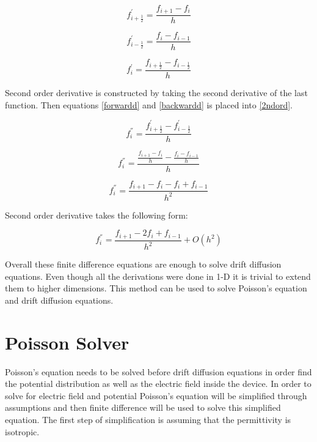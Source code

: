 \begin{doublespace}
\begin{equation}
f_{i+\frac{1}{2}}^{'}=\frac{f_{i+1}-f_{i}}{h}
\label{forwardd}
\end{equation}

\begin{equation}
f_{i-\frac{1}{2}}^{'}=\frac{f_{i}-f_{i-1}}{h}
\label{backwardd}
\end{equation}

\begin{equation}
f^{'}_{i}=\frac{f_{i+\frac{1}{2}}-f_{i-\frac{1}{2}}}{h}
\label{2ndord}
\end{equation}

Second order derivative is constructed by taking the second derivative of the last function. Then equations \ref{forwardd} and \ref{backwardd} is placed into \ref{2ndord}.

\begin{equation}\nonumber
f^{''}_{i}=\frac{f_{i+\frac{1}{2}}^{'}-f_{i-\frac{1}{2}}^{'}}{h}
\end{equation}

\begin{equation}\nonumber
f^{''}_{i}=\frac{\frac{f_{i+1}-f_{i}}{h}-\frac{f_{i}-f_{i-1}}{h}}{h}
\end{equation}

\begin{equation}\nonumber
f^{''}_{i}=\frac{f_{i+1}-f_{i}-f_{i}+f_{i-1}}{h^2}
\end{equation}

Second order derivative takes the following form:

\begin{equation}
f^{''}_{i}=\frac{f_{i+1}-2f_{i}+f_{i-1}}{h^2}+O(h^2)
\label{fdc2}
\end{equation}

Overall these finite difference equations are enough to solve drift diffusion equations. Even though all the derivations were done in 1-D it is trivial to extend them to higher dimensions. This method can be used to solve Poisson's equation and drift diffusion equations.

\clearpage

\section{Poisson Solver}

Poisson's equation needs to be solved before drift diffusion equations in order find the potential distribution as well as the electric field inside the device. In order to solve for electric field and potential Poisson's equation will be simplified through assumptions and then finite difference will be used to solve this simplified equation. The first step of simplification is assuming that the permittivity is isotropic.
 

\end{doublespace}
